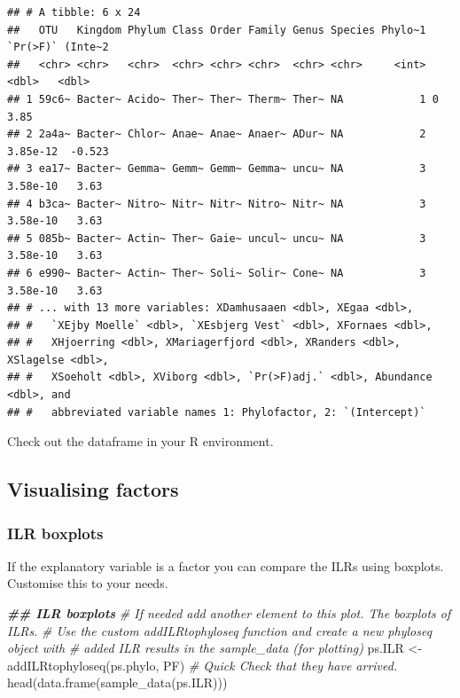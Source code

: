 \documentclass[
]{book}
\newenvironment{Shaded}{\begin{snugshade}}{\end{snugshade}}
\newcommand{\CommentTok}[1]{\textcolor[rgb]{0.56,0.35,0.01}{\textit{#1}}}
\newcommand{\DocumentationTok}[1]{\textcolor[rgb]{0.56,0.35,0.01}{\textbf{\textit{#1}}}}
\newcommand{\FunctionTok}[1]{\textcolor[rgb]{0.00,0.00,0.00}{#1}}
\newcommand{\NormalTok}[1]{#1}
\newcommand{\OtherTok}[1]{\textcolor[rgb]{0.56,0.35,0.01}{#1}}
\begin{document}
\begin{verbatim}
## # A tibble: 6 x 24
##   OTU   Kingdom Phylum Class Order Family Genus Species Phylo~1 `Pr(>F)` (Inte~2
##   <chr> <chr>   <chr>  <chr> <chr> <chr>  <chr> <chr>     <int>    <dbl>   <dbl>
## 1 59c6~ Bacter~ Acido~ Ther~ Ther~ Therm~ Ther~ NA            1 0          3.85 
## 2 2a4a~ Bacter~ Chlor~ Anae~ Anae~ Anaer~ ADur~ NA            2 3.85e-12  -0.523
## 3 ea17~ Bacter~ Gemma~ Gemm~ Gemm~ Gemma~ uncu~ NA            3 3.58e-10   3.63 
## 4 b3ca~ Bacter~ Nitro~ Nitr~ Nitr~ Nitro~ Nitr~ NA            3 3.58e-10   3.63 
## 5 085b~ Bacter~ Actin~ Ther~ Gaie~ uncul~ uncu~ NA            3 3.58e-10   3.63 
## 6 e990~ Bacter~ Actin~ Ther~ Soli~ Solir~ Cone~ NA            3 3.58e-10   3.63 
## # ... with 13 more variables: XDamhusaaen <dbl>, XEgaa <dbl>,
## #   `XEjby Moelle` <dbl>, `XEsbjerg Vest` <dbl>, XFornaes <dbl>,
## #   XHjoerring <dbl>, XMariagerfjord <dbl>, XRanders <dbl>, XSlagelse <dbl>,
## #   XSoeholt <dbl>, XViborg <dbl>, `Pr(>F)adj.` <dbl>, Abundance <dbl>, and
## #   abbreviated variable names 1: Phylofactor, 2: `(Intercept)`
\end{verbatim}

Check out the dataframe in your R environment.

\hypertarget{visualising-factors}{%
\subsection{Visualising factors}\label{visualising-factors}}

\hypertarget{ilr-boxplots}{%
\subsubsection{ILR boxplots}\label{ilr-boxplots}}

If the explanatory variable is a factor you can compare the ILRs using boxplots. Customise this to your needs.

\begin{Shaded}
\begin{Highlighting}[]
\DocumentationTok{\#\# ILR boxplots}
\CommentTok{\# If needed add another element to this plot. The boxplots of ILRs. }
\CommentTok{\# Use the custom addILRtophyloseq function and create a new phyloseq object with }
\CommentTok{\# added ILR results in the sample\_data (for plotting)}
\NormalTok{ps.ILR }\OtherTok{\textless{}{-}} \FunctionTok{addILRtophyloseq}\NormalTok{(ps.phylo, PF)}
\CommentTok{\# Quick Check that they have \textquotesingle{}arrived\textquotesingle{}.}
\FunctionTok{head}\NormalTok{(}\FunctionTok{data.frame}\NormalTok{(}\FunctionTok{sample\_data}\NormalTok{(ps.ILR)))}
\end{Highlighting}
\end{Shaded}
\end{document}
